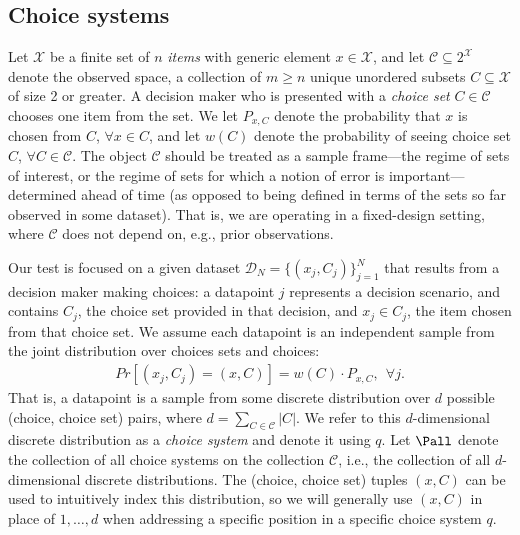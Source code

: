 \documentclass[10pt]{article}
\begin{document}
\begin{ReviewVerbatim}
\subsection{Choice systems}\label{subsection:choice_system}
	Let $\mathcal{X}$ be a finite set of $n$ \textit{items} with generic element $x \in \mathcal{X}$, and let $\mathcal{C} \subseteq 2^\mathcal{X}$ denote the observed space, a collection of $m \geq n$ unique unordered subsets $C \subseteq \mathcal{X}$ of size 2 or greater. A decision maker who is presented with a \textit{choice set} $C \in \mathcal{C}$ chooses one item from the set. We let $P_{x,C}$ denote the probability that $x$ is chosen from $C$, $\forall x \in C$, and let $w(C)$ denote the probability of seeing choice set $C$, $\forall C \in \mathcal{C}$. The object $\mathcal{C}$ should be treated as a sample frame---the regime of sets of interest, or the regime of sets for which a notion of error is important---determined ahead of time (as opposed to being defined in terms of the sets so far observed in some dataset). That is, we are operating in a fixed-design setting, where $\mathcal{C}$ does not depend on, e.g., prior observations.

	Our test is focused on a given dataset $\mathcal{D}_N = \lbrace (x_j, C_j) \rbrace_{j=1}^N$ that results from a decision maker making choices: a datapoint $j$ represents a decision scenario, and contains $C_j$, the choice set provided in that decision, and $x_j \in C_j$, the item chosen from that choice set. We assume each datapoint is an independent sample from the joint distribution over choices sets and choices:
	\begin{align*}
	Pr[(x_j, C_j) = (x, C)] = w(C) \cdot P_{x,C}, \ \ \forall j.
	\end{align*}
	That is, a datapoint is a sample from some discrete distribution over $d$ possible (choice, choice set) pairs, where $d = \sum_{C \in \mathcal{C}} |C|$. We refer to this $d$-dimensional discrete distribution as a \textit{choice system} and denote it using $q$.
	Let $\Pall$ denote the collection of all choice systems on the collection $\mathcal{C}$, i.e., the collection of all $d$-dimensional discrete distributions. The (choice, choice set) tuples $(x,C)$ can be used to intuitively index this distribution, so we will generally use $(x,C)$ in place of $1,\ldots,d$ when addressing a specific position in a specific choice system $q$.



\end{ReviewVerbatim}
\end{document}
